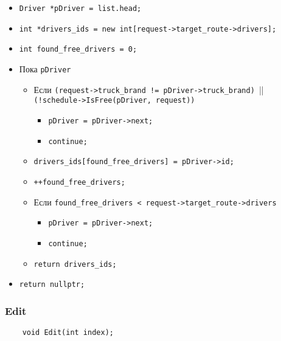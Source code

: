 \begin{itemize}
    \item \verb|Driver *pDriver = list.head;|
    \item \verb|int *drivers_ids = new int[request->target_route->drivers];|
    \item \verb|int found_free_drivers = 0;|
    \item Пока \verb|pDriver|
        \begin{itemize}
            \item Если \verb|(request->truck_brand != pDriver->truck_brand) |||\\
            \verb|(!schedule->IsFree(pDriver, request))|
                \begin{itemize}
                    \item \verb|pDriver = pDriver->next;|
                    \item \verb|continue;|
                \end{itemize}
            \item \verb|drivers_ids[found_free_drivers] = pDriver->id;|
            \item \verb|++found_free_drivers;|
            \item Если \verb|found_free_drivers < request->target_route->drivers|
                \begin{itemize}
                    \item \verb|pDriver = pDriver->next;|
                    \item \verb|continue;|
                \end{itemize}
            \item \verb|return drivers_ids;|
        \end{itemize}
    \item \verb|return nullptr;|
\end{itemize}

\subsubsection{Edit}

\begin{lstlisting}
    void Edit(int index);
\end{lstlisting}

